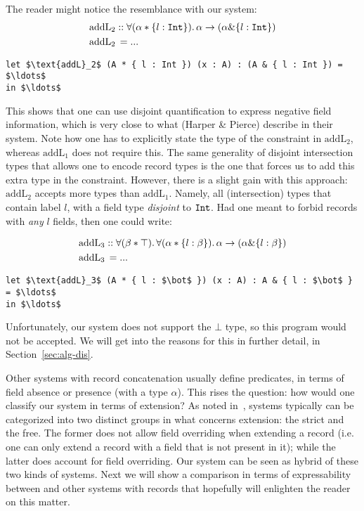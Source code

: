 The reader might notice the resemblance with our system:
\begin{align*}
&\text{addL}_2 :: \forall (\alpha * \{ l : \texttt{Int} \}).\, 
\alpha \rightarrow (\alpha \& \{ l : \texttt{Int} \}) \\
&\text{addL}_2 \, = ...
\end{align*}
\begin{lstlisting}[mathescape=true]
let $\text{addL}_2$ (A * { l : Int }) (x : A) : (A & { l : Int }) = $\ldots$ 
in $\ldots$ 
\end{lstlisting}


This shows that one can use disjoint quantification to express negative field information, which
is very close to what (Harper \& Pierce) describe in their system.  
Note how one has to explicitly state the type of the constraint in $\text{addL}_2$, whereas 
$\text{addL}_1$ does not require this.
The same generality of disjoint intersection types that allows one to encode record types is the
one that forces us to add this extra type in the constraint.
However, there is a slight gain with this approach: $\text{addL}_2$ accepts more types than
$\text{addL}_1$.
Namely, all (intersection) types that contain label $l$, with a field type \emph{disjoint} to
$\texttt{Int}$.
Had one meant to forbid records with \emph{any} $l$ fields, then one could write:

\begin{align*}
&\text{addL}_3 :: \forall (\beta * \top).\, \forall (\alpha * \{ l : \beta \}).\, 
\alpha \rightarrow (\alpha \& \{ l : \beta \}) \\
&\text{addL}_3 \, = ...
\end{align*}
\begin{lstlisting}[mathescape=true]
let $\text{addL}_3$ (A * { l : $\bot$ }) (x : A) : A & { l : $\bot$ } = $\ldots$ 
in $\ldots$ 
\end{lstlisting}
Unfortunately, our system does not support the $\bot$ type, so this program would not be accepted.
We will get into the reasons for this in further detail, in Section~\ref{sec:alg-dis}.

Other systems with record concatenation usually define predicates, in terms of field absence or 
presence (with a type $\alpha$). 
This rises the question: how would one classify our system in terms of extension? 
As noted in~\cite{leijen2004first}, systems typically can be categorized into two distinct groups
in what concerns extension: the strict and the free.
The former does not allow field overriding when extending a record (i.e. one can only extend a 
record with a field that is not present in it); while the latter does account for field overriding.
Our system can be seen as hybrid of these two kinds of systems.
Next we will show a comparison in terms of expressability between \name and other systems 
with records that hopefully will enlighten the reader on this matter.

